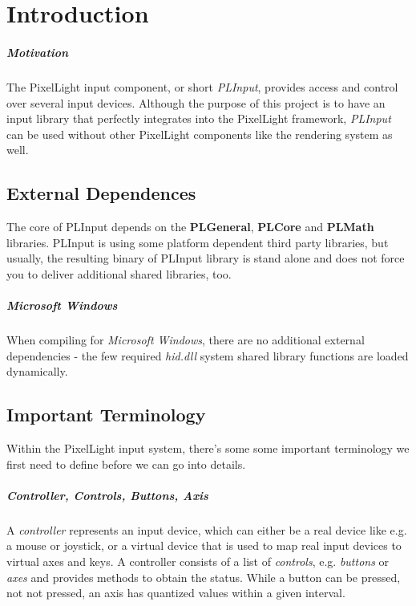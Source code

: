 \chapter{Introduction}


\paragraph{Motivation}
The PixelLight input component, or short \emph{PLInput}, provides access and control over several input devices. Although the purpose of this project is to have an input library that perfectly integrates into the PixelLight framework, \emph{PLInput} can be used without other PixelLight components like the rendering system as well.




\section{External Dependences}
The core of PLInput depends on the \textbf{PLGeneral}, \textbf{PLCore} and \textbf{PLMath} libraries. PLInput is using some platform dependent third party libraries, but usually, the resulting binary of PLInput library is stand alone and does not force you to deliver additional shared libraries, too.


\paragraph{Microsoft Windows}
When compiling for \emph{Microsoft Windows}, there are no additional external dependencies - the few required \emph{hid.dll} system shared library functions are loaded dynamically.




\section{Important Terminology}
Within the PixelLight input system, there's some some important terminology we first need to define before we can go into details.

\paragraph{Controller, Controls, Buttons, Axis}
A \emph{controller} represents an input device, which can either be a real device like e.g. a mouse or joystick, or a virtual device that is used to map real input devices to virtual axes and keys. A controller consists of a list of \emph{controls}, e.g. \emph{buttons} or \emph{axes} and provides methods to obtain the status. While a button can be pressed, not not pressed, an axis has quantized values within a given interval.

